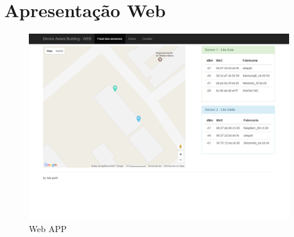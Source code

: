 \section{Apresentação Web}
\label{sec:app-web}


\begin{figure}[htb]
	\caption{\label{fig-web-app}Web APP}
	\begin{center}
		\includegraphics[width=1\textwidth]{050-construcao/web-app.png}
	\end{center}
\end{figure}
